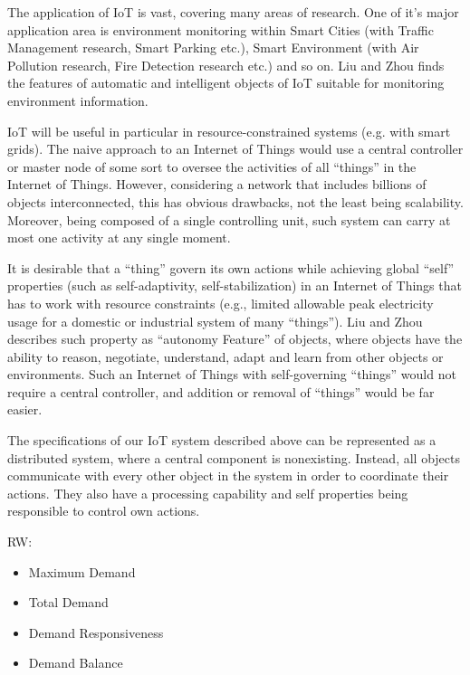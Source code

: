 \documentclass[../main/IoT.tex]{subfiles}
\begin{document}
The application of IoT is vast, covering many areas of research. One of it's major application area is environment monitoring within Smart Cities (with Traffic Management research, Smart Parking etc.), Smart Environment (with Air Pollution research, Fire Detection research etc.) and so on. Liu and Zhou \cite{IoT6150221} finds the features of automatic and intelligent objects of IoT suitable for monitoring environment information.

IoT will be useful in particular in resource-constrained systems (e.g. with smart grids). The naive approach to an Internet of Things would use a central controller or master node of some sort to oversee the activities of all ``things'' in the Internet of Things. However, considering a network that includes billions of objects interconnected, this has obvious drawbacks, not the least being scalability. Moreover, being composed of a single controlling unit, such system can carry at most one activity at any single moment.

It is desirable that a ``thing'' govern its own actions while achieving global ``self'' properties (such as self-adaptivity, self-stabilization) in an Internet of Things that has to work with resource constraints (e.g., limited allowable peak electricity usage for a domestic or industrial system of many ``things''). Liu and Zhou \cite{IoT6150221} describes such property as ``autonomy Feature'' of objects, where objects have the ability to reason, negotiate, understand, adapt and learn from other objects or environments. Such an Internet of Things with self-governing ``things'' would not require a central controller, and addition or removal of ``things'' would be far easier.

The specifications of our IoT system described above can be represented as a distributed system, where a central component is nonexisting. Instead, all objects communicate with every other object in the system in order to coordinate their actions. They also have a processing capability and self properties being responsible to control own actions.

RW:
\begin{itemize}
  \item Maximum Demand
  \item Total Demand
  \item Demand Responsiveness
  \item Demand Balance
\end{itemize}
\end{document}
